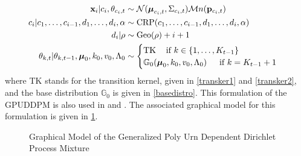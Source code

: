 \documentclass[smallcondensed, final]{svjour3}
\begin{document}
\begin{align}
\begin{split}
	 \bold{x}_{i} | c_{i}, \theta_{c_{i},t} &\sim \mathcal{N}(\boldsymbol{\mu}_{c_{i},t}, \Sigma_{c_{i},t})  \mathcal{M}n(\bold{p}_{c_{i},t}) \\
	c_{i} | c_{1}, \ldots, c_{i-1}, d_{1}, \ldots, d_{i}, \alpha  &\sim  \text{CRP}(c_{1}, \ldots, c_{i-1}, d_{1}, \ldots, d_{i}, \alpha) \\
	d_{i} | \rho  &\sim \text{Geo}(\rho) + i + 1\\
	\theta_{k, t} | \theta_{k, t-1}, \boldsymbol{\mu}_{0}, k_{0}, v_{0}, \Lambda_{0}  &\sim 
\begin{cases}
	\text{TK} \hspace{12pt} \text{if } k \in \{ 1, \ldots, K_{t-1}  \} \\
	\mathbb{G}_{0}(\boldsymbol{\mu}_{0}, k_{0}, v_{0}, \Lambda_{0})  \hspace{15pt} \text{if } k = K_{t-1} + 1
\end{cases}
\end{split}
\end{align}
where TK stands for the transition kernel, given in \eqref{transker1} and \eqref{transker2}, and the base distribution $\mathbb{G}_{0}$ is given in \eqref{basedistro}. This formulation of the GPUDDPM is also used in \cite{gasthaus_thesis} and \cite{caron_2007}. The associated graphical model for this formulation is given in \ref{fig:gpuddpm_gm_2}.
\begin{figure}[h]
        \caption{\label{fig:gpuddpm_gm_2} Graphical Model of the Generalized Poly Urn Dependent Dirichlet Process Mixture}
\end{figure}
\end{document}
